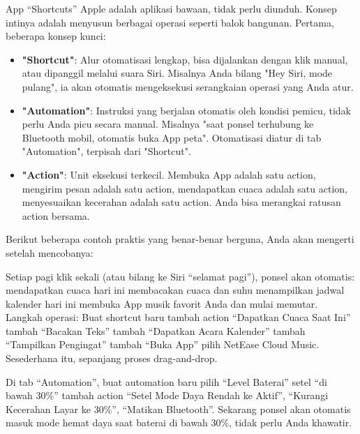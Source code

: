 
App “Shortcuts” Apple adalah aplikasi bawaan, tidak perlu diunduh. Konsep intinya adalah menyusun berbagai operasi seperti balok bangunan. Pertama, beberapa konsep kunci:

\begin{itemize}
  \item \textbf{"Shortcut"}: Alur otomatisasi lengkap, bisa dijalankan dengan klik manual, atau dipanggil melalui suara Siri. Misalnya Anda bilang "Hey Siri, mode pulang", ia akan otomatis mengeksekusi serangkaian operasi yang Anda atur.
  \item \textbf{"Automation"}: Instruksi yang berjalan otomatis oleh kondisi pemicu, tidak perlu Anda picu secara manual. Misalnya "saat ponsel terhubung ke Bluetooth mobil, otomatis buka App peta". Otomatisasi diatur di tab "Automation", terpisah dari "Shortcut".
  \item \textbf{"Action"}: Unit eksekusi terkecil. Membuka App adalah satu action, mengirim pesan adalah satu action, mendapatkan cuaca adalah satu action, menyesuaikan kecerahan adalah satu action. Anda bisa merangkai ratusan action bersama.
\end{itemize}

Berikut beberapa contoh praktis yang benar-benar berguna, Anda akan mengerti setelah mencobanya:


Setiap pagi klik sekali (atau bilang ke Siri “selamat pagi”), ponsel akan otomatis: mendapatkan cuaca hari ini membacakan cuaca dan suhu menampilkan jadwal kalender hari ini membuka App musik favorit Anda dan mulai memutar. Langkah operasi: Buat shortcut baru tambah action “Dapatkan Cuaca Saat Ini” tambah “Bacakan Teks” tambah “Dapatkan Acara Kalender” tambah “Tampilkan Pengingat” tambah “Buka App” pilih NetEase Cloud Music. Sesederhana itu, sepanjang proses drag-and-drop.


Di tab “Automation”, buat automation baru pilih “Level Baterai” setel “di bawah 30\%” tambah action “Setel Mode Daya Rendah ke Aktif”, “Kurangi Kecerahan Layar ke 30\%”, “Matikan Bluetooth”. Sekarang ponsel akan otomatis masuk mode hemat daya saat baterai di bawah 30\%, tidak perlu Anda khawatir.


